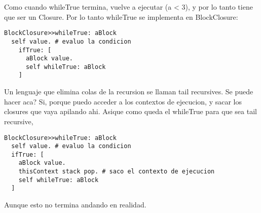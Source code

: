 Como cuando whileTrue termina, vuelve a ejecutar (a < 3), y por lo tanto tiene que ser un Closure. Por lo tanto whileTrue se implementa en BlockClosure:

\begin{verbatim}
BlockClosure>>whileTrue: aBlock
  self value. # evaluo la condicion
    ifTrue: [
      aBlock value.
      self whileTrue: aBlock
    ]
\end{verbatim}

Un lenguaje que elimina colas de la recursion se llaman tail recursives. Se puede hacer aca? Si, porque puedo acceder a los contextos de ejecucion, y sacar los closures que vaya apilando ahi. 
Asique como queda el whileTrue para que sea tail recursive, 

\begin{verbatim}
BlockClosure>>whileTrue: aBlock
  self value. # evaluo la condicion
  ifTrue: [
    aBlock value.
    thisContext stack pop. # saco el contexto de ejecucion
    self whileTrue: aBlock
  ]
\end{verbatim}

Aunque esto no termina andando en realidad. 

